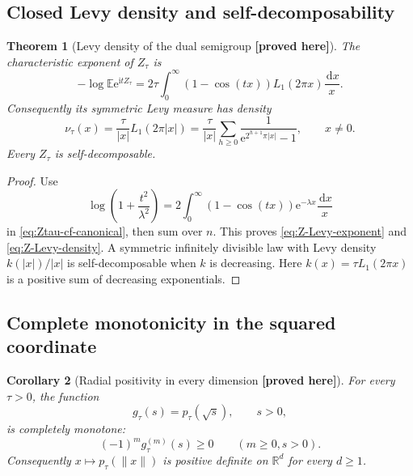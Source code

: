\documentclass[11pt,oneside]{article}
\newtheorem{theorem}{Theorem}[section]
\newtheorem{corollary}[theorem]{Corollary}
\theoremstyle{definition}
\theoremstyle{remark}
\newcommand{\R}{\mathbb R}
\newcommand{\E}{\mathbb E}
\newcommand{\e}{\mathrm e}
\newcommand{\ii}{\mathrm i}
\newcommand{\dd}{\,\mathrm d}
\newcommand{\New}{\textcolor{amber}{\textbf{[proved here]}}}
\begin{document}
\subsection{Closed Levy density and self-decomposability}

\begin{theorem}[Levy density of the dual semigroup \New]
The characteristic exponent of $Z_\tau$ is
\begin{equation}
 -\log\E\e^{\ii tZ_\tau}
 =2\tau\int_0^\infty(1-\cos(tx))L_1(2\pi x)\frac{\dd x}{x}.  \label{eq:Z-Levy-exponent}
\end{equation}
Consequently its symmetric Levy measure has density
\begin{equation}
 \boxed{\quad
 \nu_\tau(x)=\frac{\tau}{|x|}L_1(2\pi|x|)
 =\frac{\tau}{|x|}\sum_{h\ge0}
   \frac{1}{\e^{2^{h+1}\pi|x|}-1},
 \qquad x\ne0.
 \quad}                                                  \label{eq:Z-Levy-density}
\end{equation}
Every $Z_\tau$ is self-decomposable.
\end{theorem}

\begin{proof}
Use
\[
 \log\left(1+\frac{t^2}{\lambda^2}\right)
 =2\int_0^\infty(1-\cos(tx))\e^{-\lambda x}\frac{\dd x}{x}
\]
in \eqref{eq:Ztau-cf-canonical}, then sum over $n$.  This proves
\eqref{eq:Z-Levy-exponent} and \eqref{eq:Z-Levy-density}.  A symmetric infinitely divisible
law with Levy density $k(|x|)/|x|$ is self-decomposable when $k$ is decreasing.  Here
$k(x)=\tau L_1(2\pi x)$ is a positive sum of decreasing exponentials.
\end{proof}

\subsection{Complete monotonicity in the squared coordinate}

\begin{corollary}[Radial positivity in every dimension \New]
For every $\tau>0$, the function
\begin{equation}
 g_\tau(s)=p_\tau(\sqrt s),\qquad s>0,                    \label{eq:g-density}
\end{equation}
is completely monotone:
\begin{equation}
 (-1)^m g_\tau^{(m)}(s)\ge0\qquad(m\ge0,s>0).            \label{eq:CM-density}
\end{equation}
Consequently $x\mapsto p_\tau(\|x\|)$ is positive definite on $\R^d$ for every
$d\ge1$.
\end{corollary}
\end{document}
